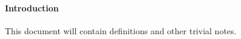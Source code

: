 \documentclass{article} %
\begin{document}
\paragraph{Introduction}
This document will contain definitions and other trivial notes.
\end{document}
